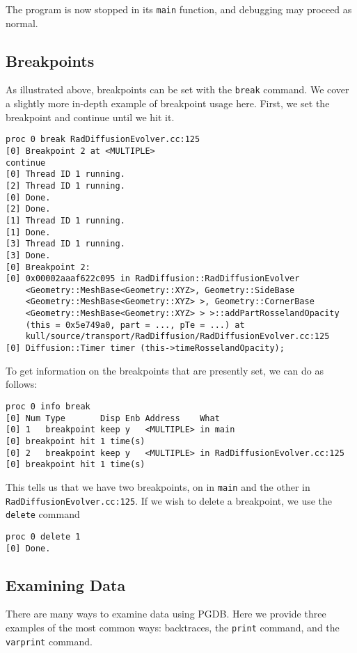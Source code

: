 \documentclass{refart}
\begin{document}
The program is now stopped in its \texttt{main} function, and debugging may proceed as normal.

\subsection{Breakpoints}

As illustrated above, breakpoints can be set with the \texttt{break} command. We cover a slightly more in-depth example of breakpoint usage here. First, we set the breakpoint and continue until we hit it.

\begin{Verbatim}
proc 0 break RadDiffusionEvolver.cc:125  
[0] Breakpoint 2 at <MULTIPLE>
continue
[0] Thread ID 1 running.
[2] Thread ID 1 running.
[0] Done.
[2] Done.
[1] Thread ID 1 running.
[1] Done.
[3] Thread ID 1 running.
[3] Done.
[0] Breakpoint 2:
[0] 0x00002aaaf622c095 in RadDiffusion::RadDiffusionEvolver
    <Geometry::MeshBase<Geometry::XYZ>, Geometry::SideBase
    <Geometry::MeshBase<Geometry::XYZ> >, Geometry::CornerBase
    <Geometry::MeshBase<Geometry::XYZ> > >::addPartRosselandOpacity
    (this = 0x5e749a0, part = ..., pTe = ...) at
    kull/source/transport/RadDiffusion/RadDiffusionEvolver.cc:125
[0] Diffusion::Timer timer (this->timeRosselandOpacity);
\end{Verbatim}

To get information on the breakpoints that are presently set, we can do as follows:

\begin{Verbatim}
proc 0 info break
[0] Num Type       Disp Enb Address    What
[0] 1   breakpoint keep y   <MULTIPLE> in main
[0] breakpoint hit 1 time(s)
[0] 2   breakpoint keep y   <MULTIPLE> in RadDiffusionEvolver.cc:125
[0] breakpoint hit 1 time(s)
\end{Verbatim}

This tells us that we have two breakpoints, on in \texttt{main} and the other in \texttt{RadDiffusionEvolver.cc:125}. If we wish to delete a breakpoint, we use the \texttt{delete} command

\begin{Verbatim}
proc 0 delete 1
[0] Done.
\end{Verbatim}

\subsection{Examining Data}

There are many ways to examine data using PGDB. Here we provide three examples of the most common ways: backtraces, the \texttt{print} command, and the \texttt{varprint} command.
\end{document}
